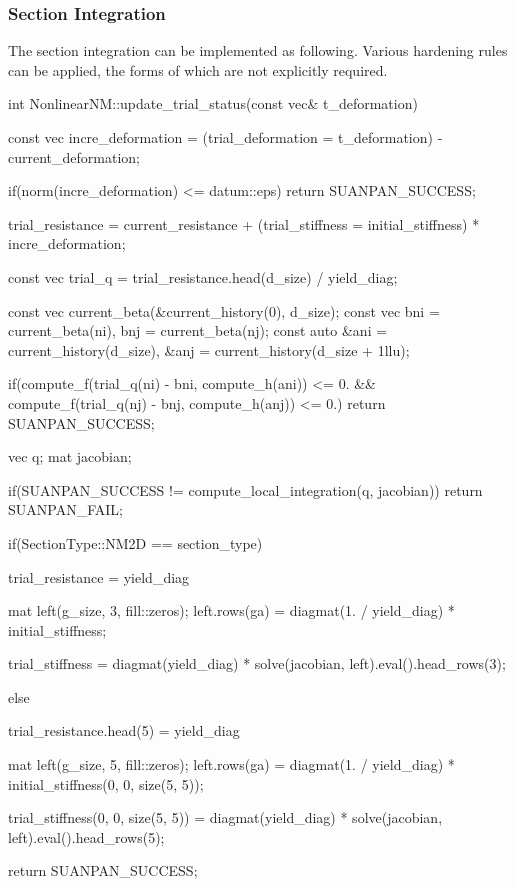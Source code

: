 \subsubsection{Section Integration}
The section integration can be implemented as following. Various hardening rules can be applied, the forms of which are not explicitly required.
\begin{cppcode}
int NonlinearNM::update_trial_status(const vec& t_deformation) {
    const vec incre_deformation = (trial_deformation = t_deformation) - current_deformation;

    if(norm(incre_deformation) <= datum::eps) return SUANPAN_SUCCESS;

    trial_resistance = current_resistance + (trial_stiffness = initial_stiffness) * incre_deformation;

    const vec trial_q = trial_resistance.head(d_size) / yield_diag;

    const vec current_beta(&current_history(0), d_size);
    const vec bni = current_beta(ni), bnj = current_beta(nj);
    const auto &ani = current_history(d_size), &anj = current_history(d_size + 1llu);

    if(compute_f(trial_q(ni) - bni, compute_h(ani)) <= 0. && compute_f(trial_q(nj) - bnj, compute_h(anj)) <= 0.) return SUANPAN_SUCCESS;

    vec q;
    mat jacobian;

    if(SUANPAN_SUCCESS != compute_local_integration(q, jacobian)) return SUANPAN_FAIL;

    if(SectionType::NM2D == section_type) {
        trial_resistance = yield_diag %

        mat left(g_size, 3, fill::zeros);
        left.rows(ga) = diagmat(1. / yield_diag) * initial_stiffness;

        trial_stiffness = diagmat(yield_diag) * solve(jacobian, left).eval().head_rows(3);
    }
    else {
        trial_resistance.head(5) = yield_diag %

        mat left(g_size, 5, fill::zeros);
        left.rows(ga) = diagmat(1. / yield_diag) * initial_stiffness(0, 0, size(5, 5));

        trial_stiffness(0, 0, size(5, 5)) = diagmat(yield_diag) * solve(jacobian, left).eval().head_rows(5);
    }

    return SUANPAN_SUCCESS;
}
\end{cppcode}


